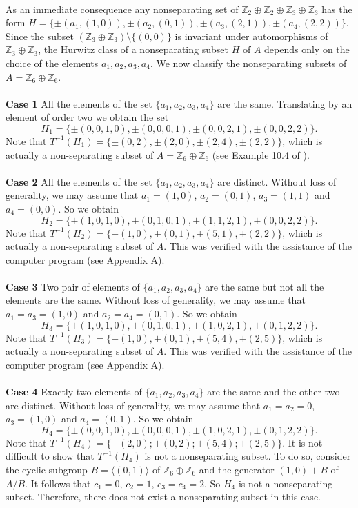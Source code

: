 \documentclass[article,dvisp]{amsart}
\def\Z{\mathbb{Z}}
\theoremstyle{definition}
\theoremstyle{remark}
\numberwithin{equation}{section}
\theoremstyle{lemma}
\begin{document}
\\
As an immediate consequence any nonseparating set of $\Z_{2}\oplus \Z_{2}\oplus \Z_{3}\oplus \Z_{3}$ has the form $H=\{\pm(a_{1},(1,0)),\pm(a_{2},(0,1)),\pm(a_{3},(2,1)),\pm(a_{4},(2,2))\}$.
Since the subset $(\Z_{3}\oplus \Z_{3})\setminus\{(0,0)\}$ is invariant under automorphisms of $\Z_{3}\oplus \Z_{3}$, the Hurwitz class of a nonseparating subset $H$ of $A$ depends only on the choice of the elements $a_{1}, a_{2}, a_{3}, a_{4}$. We now classify the nonseparating subsets of  $A=\Z_{6}\oplus\Z_{6}$.\\
\\
\textbf{Case 1} All the elements of the set $\{a_{1},a_{2},a_{3},a_{4}\}$ are the same. Translating by an element of order two we obtain the set
$$H_{1}=\{\pm(0,0,1,0),\pm(0,0,0,1),\pm(0,0,2,1),\pm(0,0,2,2)\}.$$
Note that $T^{-1}(H_{1})=\{\pm(0,2),\pm(2,0),\pm(2,4),\pm(2,2)\}$, which is actually a non-separating subset of $A=\Z_{6}\oplus\Z_{6}$ (see Example 10.4 of \cite{CFPP}).\\ 
\\
\textbf{Case 2} All the elements of the set $\{a_{1},a_{2},a_{3},a_{4}\}$ are distinct. Without loss of generality, we may assume that $a_{1}=(1,0)$, $a_{2}=(0,1)$, $a_{3}=(1,1)$ and $a_{4}=(0,0)$. So we obtain 
$$H_{2}=\{\pm(1,0,1,0),\pm(0,1,0,1),\pm(1,1,2,1),\pm(0,0,2,2)\}.$$
Note that $T^{-1}(H_{2})=\{\pm(1,0),\pm(0,1),\pm(5,1),\pm(2,2)\}$, which is actually a non-separating subset of $A$. This was verified with the assistance of the computer program (see Appendix A).\\ 
\\
\textbf{Case 3} Two pair of elements of $\{a_{1},a_{2},a_{3},a_{4}\}$ are the same but not all the elements are the same. Without loss of generality, we may assume that $a_{1}=a_{3}=(1,0)$ and $a_{2}=a_{4}=(0,1)$. So we obtain
$$H_{3}=\{\pm(1,0,1,0),\pm(0,1,0,1),\pm(1,0,2,1),\pm(0,1,2,2)\}.$$
Note that $T^{-1}(H_{3})=\{\pm(1,0),\pm(0,1),\pm(5,4),\pm(2,5)\}$, which is actually a non-separating subset of $A$. This was verified with the assistance of the computer program (see Appendix A).\\ 
\\
\textbf{Case 4}  Exactly two elements of $\{a_{1},a_{2},a_{3},a_{4}\}$ are the same and the other two are distinct. Without loss of generality, we may assume that $a_{1}=a_{2}=0$, $a_{3}=(1,0)$ and $a_{4}=(0,1)$. So we obtain
$$H_{4}=\{\pm(0,0,1,0),\pm(0,0,0,1),\pm(1,0,2,1),\pm(0,1,2,2)\}.$$
Note that $T^{-1}(H_{4})=\{\pm (2,0);\pm(0,2);\pm(5,4);\pm(2,5)\}$. It is not difficult to show that $T^{-1}(H_{4})$ is not a nonseparating subset. To do so, consider the cyclic subgroup $B=\langle(0,1)\rangle$ of $\Z_{6}\oplus \Z_{6}$ and the generator $(1,0)+B$ of $A/B$. It follows that $c_{1}=0$, $c_{2}=1$, $c_{3}=c_{4}=2$. So $H_{4}$ is not a nonseparating subset. Therefore, there does not exist a nonseparating subset in this case.\\
\end{document}
